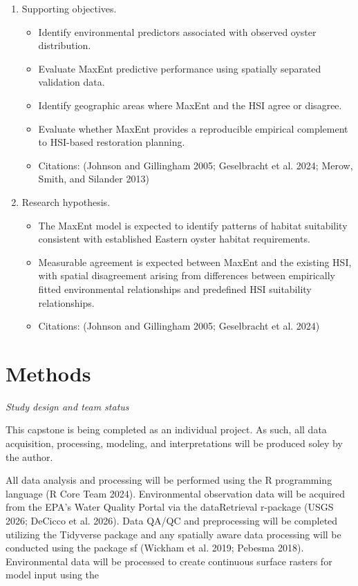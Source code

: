 \documentclass[
  letterpaper,
  DIV=11,
  numbers=noendperiod]{scrartcl}
\providecommand{\tightlist}{%
  \setlength{\itemsep}{0pt}\setlength{\parskip}{0pt}}
\begin{document}
\begin{enumerate}
\def\labelenumi{\arabic{enumi}.}
\setcounter{enumi}{3}
\tightlist
\item
  Supporting objectives.

  \begin{itemize}
  \tightlist
  \item
    Identify environmental predictors associated with observed oyster
    distribution.
  \item
    Evaluate MaxEnt predictive performance using spatially separated
    validation data.
  \item
    Identify geographic areas where MaxEnt and the HSI agree or
    disagree.
  \item
    Evaluate whether MaxEnt provides a reproducible empirical complement
    to HSI-based restoration planning.
  \item
    Citations: (Johnson and Gillingham 2005; Geselbracht et al. 2024;
    Merow, Smith, and Silander 2013)
  \end{itemize}
\item
  Research hypothesis.

  \begin{itemize}
  \tightlist
  \item
    The MaxEnt model is expected to identify patterns of habitat
    suitability consistent with established Eastern oyster habitat
    requirements.
  \item
    Measurable agreement is expected between MaxEnt and the existing
    HSI, with spatial disagreement arising from differences between
    empirically fitted environmental relationships and predefined HSI
    suitability relationships.
  \item
    Citations: (Johnson and Gillingham 2005; Geselbracht et al. 2024)
  \end{itemize}
\end{enumerate}

\section{Methods}\label{methods}

\emph{Study design and team status}

This capstone is being completed as an individual project. As such, all
data acquisition, processing, modeling, and interpretations will be
produced soley by the author.

All data analysis and processing will be performed using the R
programming language (R Core Team 2024). Environmental observation data
will be acquired from the EPA's Water Quality Portal via the
dataRetrieval r-package (USGS 2026; DeCicco et al. 2026). Data QA/QC and
preprocessing will be completed utilizing the Tidyverse package and any
spatially aware data processing will be conducted using the package sf
(Wickham et al. 2019; Pebesma 2018). Environmental data will be
processed to create continuous surface rasters for model input using the
\end{document}
